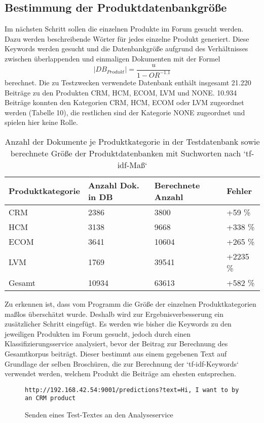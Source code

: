 \subsection{Bestimmung der Produktdatenbankgröße}

Im nächsten Schritt sollen die einzelnen Produkte im Forum gesucht werden. Dazu werden beschreibende Wörter für jedes einzelne Produkt generiert. Diese Keywords werden gesucht und die Datenbankgröße aufgrund des Verhältnisses zwischen überlappenden und einmaligen Dokumenten mit der Formel \[|DB_{Produkt}| = \frac{u}{1-OR^{-1.1}}\] \cite{lu2008efficient} berechnet. Die zu Testzwecken verwendete Datenbank enthält insgesamt 21.220 Beiträge zu den Produkten CRM, HCM, ECOM, LVM und NONE. 10.934 Beiträge konnten den Kategorien CRM, HCM, ECOM oder LVM zugeordnet werden (Tabelle 10), die restlichen sind der Kategorie NONE zugeordnet und spielen hier keine Rolle.

\begin{table}[h!]
\centering 
\begin{tabular}{ | p{3cm} | l | l | l |}
\hline
\textbf{Produktkategorie} & \textbf{Anzahl Dok. in DB} & \textbf{Berechnete Anzahl} & \textbf{Fehler}\\ \hline
CRM & 2386 & 3800 & +59 \%\\ \hline
HCM & 3138 & 9668 & +338 \%\\ \hline
ECOM & 3641 & 10604 & +265 \%\\ \hline
LVM & 1769 & 39541 & +2235 \%\\ \hline
Gesamt & 10934 & 63613 & +582 \% \\ \hline
\end{tabular}
\caption{Anzahl der Dokumente je Produktkategorie in der Testdatenbank sowie berechnete Größe der Produktdatenbanken mit Suchworten nach `tf-idf-Maß`}
\end{table}

Zu erkennen ist, dass vom Programm die Größe der einzelnen Produktkategorien maßlos überschätzt wurde. Deshalb wird zur Ergebnisverbesserung ein zusätzlicher Schritt eingefügt. Es werden wie bisher die Keywords zu den jeweiligen Produkten im Forum gesucht, jedoch durch einen Klassifizierungsservice \cite{n2o} analysiert, bevor der Beitrag zur Berechnung des Gesamtkorpus beiträgt. Dieser bestimmt aus einem gegebenen Text auf Grundlage der selben Broschüren, die zur Berechnung der `tf-idf-Keywords` verwendet werden, welchem Produkt die Beiträge am ehesten entsprechen.

\begin{figure}[h!]
\begin{lstlisting}[language=HTML5]
http://192.168.42.54:9001/predictions?text=Hi, I want to by an CRM product
\end{lstlisting}
\caption{Senden eines Test-Textes an den Analyseservice}
\end{figure}

